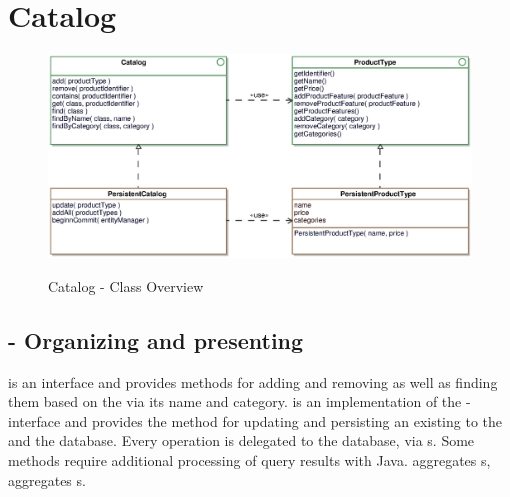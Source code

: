 \newpage
\section{Catalog}
\label{sec:catalog}

\begin{figure}[ht]
	\centering
  \includegraphics[width=1.0\textwidth]{images/Catalog_Overview.eps}
	\label{catalog_overview}
	\caption{Catalog - Class Overview}
\end{figure}

\subsection{ - Organizing and presenting }
 is an interface and provides methods for adding and removing  as well as finding them based on the  via its name and category.
 is an implementation of the -interface and provides the  method for updating and persisting an existing  to the  and the database. 
Every operation is delegated to the database, via s. Some methods require additional processing of query results with Java.
 aggregates s,  aggregates s.





